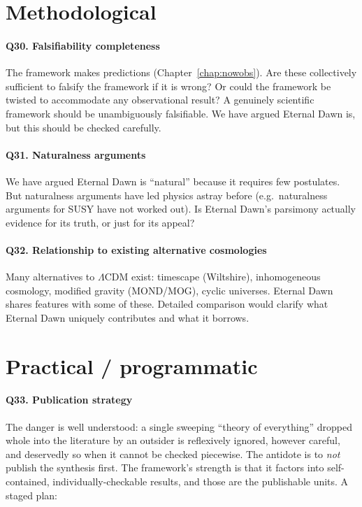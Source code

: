 \section{Methodological}

\paragraph{Q30. Falsifiability completeness}
The framework makes predictions (Chapter~\ref{chap:nowobs}). Are these
collectively sufficient to falsify the framework if it is wrong? Or could the
framework be twisted to accommodate any observational result? A genuinely
scientific framework should be unambiguously falsifiable. We have argued Eternal Dawn is,
but this should be checked carefully.

\paragraph{Q31. Naturalness arguments}
We have argued Eternal Dawn is ``natural'' because it requires few postulates. But
naturalness arguments have led physics astray before (e.g.\ naturalness arguments
for SUSY have not worked out). Is Eternal Dawn's parsimony actually evidence for its
truth, or just for its appeal?

\paragraph{Q32. Relationship to existing alternative cosmologies}
Many alternatives to $\Lambda$CDM exist: timescape (Wiltshire), inhomogeneous
cosmology, modified gravity (MOND/MOG), cyclic universes. Eternal Dawn shares features
with some of these. Detailed comparison would clarify what Eternal Dawn uniquely
contributes and what it borrows.

\section{Practical / programmatic}

\paragraph{Q33. Publication strategy}
The danger is well understood: a single sweeping ``theory of everything'' dropped
whole into the literature by an outsider is reflexively ignored, however careful, and
deservedly so when it cannot be checked piecewise. The antidote is to \emph{not}
publish the synthesis first. The framework's strength is that it factors into
self-contained, individually-checkable results, and those are the publishable units.
A staged plan:

